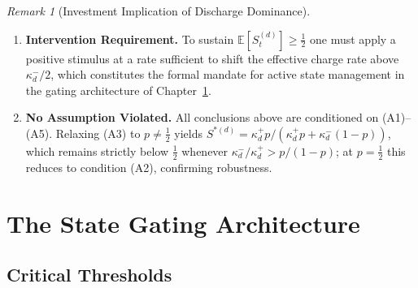 \documentclass[12pt,openany]{book}
\numberwithin{equation}{chapter}
\theoremstyle{plain}
\theoremstyle{definition}
\theoremstyle{remark}
\newtheorem{remark}[theorem]{Remark}
\def\mathcal#1{#1}%
\begin{document}
\begin{remark}[Investment Implication of Discharge Dominance]
\begin{enumerate}
  \item \textbf{Intervention Requirement.}
    To sustain $\mathbb{E}[\mathcal{S}_t^{(d)}] \geq \tfrac{1}{2}$
    one must apply a positive stimulus at a rate sufficient to
    shift the effective charge rate above $\kappa_d^{-}/2$,
    which constitutes the formal mandate for active state
    management in the gating architecture of
    Chapter~\ref{ch:gating}.

  \item \textbf{No Assumption Violated.}
    All conclusions above are conditioned on (A1)--(A5).
    Relaxing (A3) to $p \neq \tfrac{1}{2}$ yields
    $\mathcal{S}^{*(d)} =
    \kappa_d^{+} p /
    (\kappa_d^{+} p + \kappa_d^{-}(1-p))$,
    which remains strictly below $\tfrac{1}{2}$ whenever
    $\kappa_d^{-}/\kappa_d^{+} > p/(1-p)$; at $p=\tfrac{1}{2}$
    this reduces to condition (A2), confirming robustness.
\end{enumerate}
\end{remark}

\chapter{The State Gating Architecture}
\label{ch:gating}

\section{Critical Thresholds}
\end{document}
